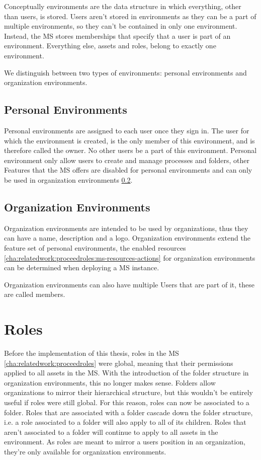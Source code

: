 Conceptually environments are the data structure in which everything, other than users, is
stored.
Users aren't stored in environments as they can be a part of multiple environments, 
so they can't be contained in only one environment.
Instead, the MS stores memberships that specify that a user is part of an environment.
Everything else, assets and roles, belong to exactly one environment.

We distinguish between two types of environments: personal environments and organization
environments.

\subsection{Personal Environments}
\label{cha:conceptanddesign:environments:personal}

Personal environments are assigned to each user once they sign in. 
The user for which the environment is created, is the only member of this
environment, and is therefore called the owner.
No other users be a part of this environment.
Personal environment only allow users to create and manage processes and folders,
other Features that the MS offers are disabled for personal environments and can only be
used in organization environments \ref{cha:conceptanddesign:environments:organization}.

\subsection{Organization Environments}
\label{cha:conceptanddesign:environments:organization}

Organization environments are intended to be used by organizations, thus they can have a
name, description and a logo.
Organization environments extend the feature set of personal environments, the enabled
resources \ref{cha:relatedwork:proceedroles:ms-resources-actions} for organization
environments can be determined when deploying a MS instance.

Organization environments can also have multiple Users that are part of it, these are
called members.


\section{Roles}

Before the implementation of this thesis, roles in the MS
\ref{cha:relatedwork:proceedroles} were global,
meaning that their permissions applied to all assets in the MS.
With the introduction of the folder structure in organization environments, this no longer makes sense.
Folders allow organizations to mirror their hierarchical structure, but this wouldn't be
entirely useful if roles were still global.
For this reason, roles can now be associated to a folder.
Roles that are associated with a folder cascade down the
folder structure, i.e. a role associated to a folder will also apply to all of its children.
Roles that aren't associated to a folder will continue to apply to all assets in the environment.
As roles are meant to mirror a users position in an organization, they're only available
for organization environments.

